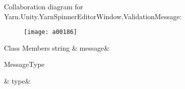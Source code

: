 Collaboration diagram for Yarn.\-Unity.\-Yarn\-Spinner\-Editor\-Window.\-Validation\-Message\-:
\nopagebreak
\begin{figure}[H]
\begin{center}
\leavevmode
\texttt{[image: a00186]}
\end{center}
\end{figure}
\begin{DoxyFields}{Class Members}
\hypertarget{a00099_a636dce6708e779c201fa5e7d01cf2955}{string}\label{a00099_a636dce6708e779c201fa5e7d01cf2955}
&
message&
\\
\hline

\hypertarget{a00099_a7d342190c7657fbbe85eb6fa66bcabb8}{Message\-Type}\label{a00099_a7d342190c7657fbbe85eb6fa66bcabb8}
&
type&
\\
\hline

\end{DoxyFields}
